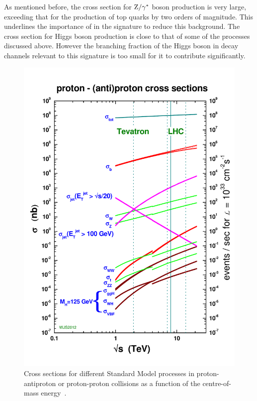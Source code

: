 As mentioned before, the cross section for $\mathrm{Z}/\gamma^{*}$ boson production is very large, exceeding that for the production of top quarks by two orders of magnitude. This underlines the importance of \MET in the signature to reduce this background.
The cross section for Higgs boson production is close to that of some of the processes discussed above. However the branching fraction of the Higgs boson in decay channels relevant to this signature is too small for it to contribute significantly. 
\begin{figure}
\centering
\includegraphics[scale=0.5]{plots/THEO/crosssections2012_v5.pdf}
\caption{Cross sections for different Standard Model processes in proton-antiproton or proton-proton collisions as a function of the centre-of-mass energy~\cite{sterling}.}
\label{fig:xsecs}
\end{figure}  